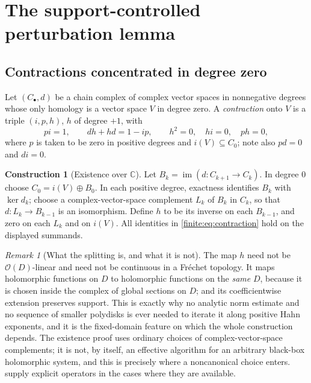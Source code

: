 \documentclass[11pt,letterpaper]{article}
\theoremstyle{definition}
\newtheorem{construction}[theorem]{Construction}
\theoremstyle{remark}
\newtheorem{remark}[theorem]{Remark}
\newcommand{\C}{\mathbb C}
\newcommand{\OO}{\mathcal O}
\DeclareMathOperator{\im}{im}
\numberwithin{equation}{section}
\begin{document}
\section{The support-controlled perturbation lemma}
\label{finite:sec:perturbation}

\subsection{Contractions concentrated in degree zero}
\label{finite:sec:contraction}

Let $(C_\bullet,d)$ be a chain complex of complex vector spaces in nonnegative degrees whose only homology is a vector space $V$ in degree zero. A \emph{contraction} onto $V$ is a triple $(i,p,h)$, $h$ of degree $+1$, with
\begin{equation}\label{finite:eq:contraction}
 pi=1,\qquad dh+hd=1-ip,\qquad h^2=0,\quad hi=0,\quad ph=0,
\end{equation}
where $p$ is taken to be zero in positive degrees and $i(V)\subseteq C_0$; note also $pd=0$ and $di=0$.

\begin{construction}[Existence over $\C$]
\label{finite:constr:h}
Let $B_k=\im(d:C_{k+1}\to C_k)$. In degree $0$ choose $C_0=i(V)\oplus B_0$. In each positive degree, exactness identifies $B_k$ with $\ker d_k$; choose a complex-vector-space complement $L_k$ of $B_k$ in $C_k$, so that $d:L_k\to B_{k-1}$ is an isomorphism. Define $h$ to be its inverse on each $B_{k-1}$, and zero on each $L_k$ and on $i(V)$. All identities in \eqref{finite:eq:contraction} hold on the displayed summands.
\end{construction}

\begin{remark}[What the splitting is, and what it is not]
\label{finite:rem:splitting}
The map $h$ need not be $\OO(D)$-linear and need not be continuous in a Fr\'echet topology. It maps holomorphic functions on $D$ to holomorphic functions on the \emph{same} $D$, because it is chosen inside the complex of global sections on $D$; and its coefficientwise extension preserves support. This is exactly why no analytic norm estimate and no sequence of smaller polydisks is ever needed to iterate it along positive Hahn exponents, and it is the fixed-domain feature on which the whole construction depends. The existence proof uses ordinary choices of complex-vector-space complements; it is not, by itself, an effective algorithm for an arbitrary black-box holomorphic system, and this is precisely where a noncanonical choice enters.  supply explicit operators in the cases where they are available.
\end{remark}
\end{document}
